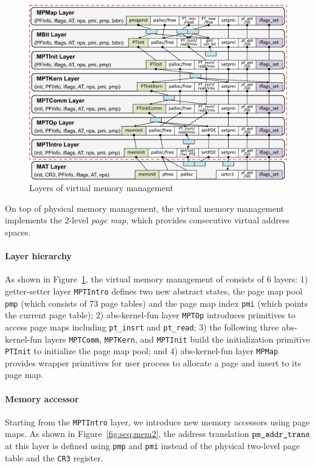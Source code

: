 \begin{figure}\centering
\includegraphics[scale=0.5]{figs/vmm_layer}	
\caption{Layers of virtual memory management}
\label{fig:base:vmm:layers}
\hrulefill
\end{figure}

On top of physical memory management,
the virtual memory management implements
the 2-level \emph{page map}, which
provides consecutive virtual address spaces.

\paragraph{Layer hierarchy}
As shown in
Figure~\ref{fig:base:vmm:layers}, the virtual memory management of
\mCTOSbase{} consists of 6 layers: 1) getter-setter layer \verb"MPTIntro"
defines two new abstract states, the page map pool \verb"pmp" (which
consists of 73 page tables) and the page map index \verb"pmi" (which
points the current page table); 
2) abs-kernel-fun layer \verb"MPTOp"
introduces primitives to access page maps including \verb"pt_insrt" and
\verb"pt_read"; 3) the following three abs-kernel-fun layers
\verb"MPTComm", \verb"MPTKern", and \verb"MPTInit" build the
initialization primitive \verb"PTInit" to initialize the page map pool;
and 4) abs-kernel-fun layer \verb"MPMap" 
provides wrapper primitives
for user process to allocate a page and insert to its page map.

\paragraph{Memory accessor}
Starting from the \verb"MPTIntro" layer, we 
introduce new memory accessors
using page maps.
As shown in Figure~\ref{fig:seq:mem2},
the
address translation ${\texttt{pm\_addr\_trans}}$ at this layer is defined
using \verb"pmp" and \verb"pmi" instead of the physical two-level page
table and the \verb"CR3" register. 

